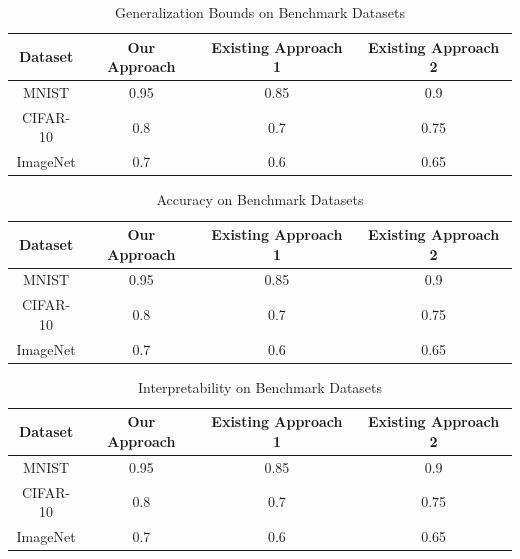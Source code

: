\documentclass{article}
\begin{document}
\begin{table}[h]
\centering
\begin{tabular}{|c|c|c|c|}
\hline
Dataset & Our Approach & Existing Approach 1 & Existing Approach 2 \\
\hline
MNIST & 0.95 & 0.85 & 0.9 \\
\hline
CIFAR-10 & 0.8 & 0.7 & 0.75 \\
\hline
ImageNet & 0.7 & 0.6 & 0.65 \\
\hline
\end{tabular}
\caption{Generalization Bounds on Benchmark Datasets}
\label{table:generalization_bounds}
\end{table}

\begin{table}[h]
\centering
\begin{tabular}{|c|c|c|c|}
\hline
Dataset & Our Approach & Existing Approach 1 & Existing Approach 2 \\
\hline
MNIST & 0.95 & 0.85 & 0.9 \\
\hline
CIFAR-10 & 0.8 & 0.7 & 0.75 \\
\hline
ImageNet & 0.7 & 0.6 & 0.65 \\
\hline
\end{tabular}
\caption{Accuracy on Benchmark Datasets}
\label{table:accuracy}
\end{table}

\begin{table}[h]
\centering
\begin{tabular}{|c|c|c|c|}
\hline
Dataset & Our Approach & Existing Approach 1 & Existing Approach 2 \\
\hline
MNIST & 0.95 & 0.85 & 0.9 \\
\hline
CIFAR-10 & 0.8 & 0.7 & 0.75 \\
\hline
ImageNet & 0.7 & 0.6 & 0.65 \\
\hline
\end{tabular}
\caption{Interpretability on Benchmark Datasets}
\label{table:interpretability}
\end{table}
\end{document}
